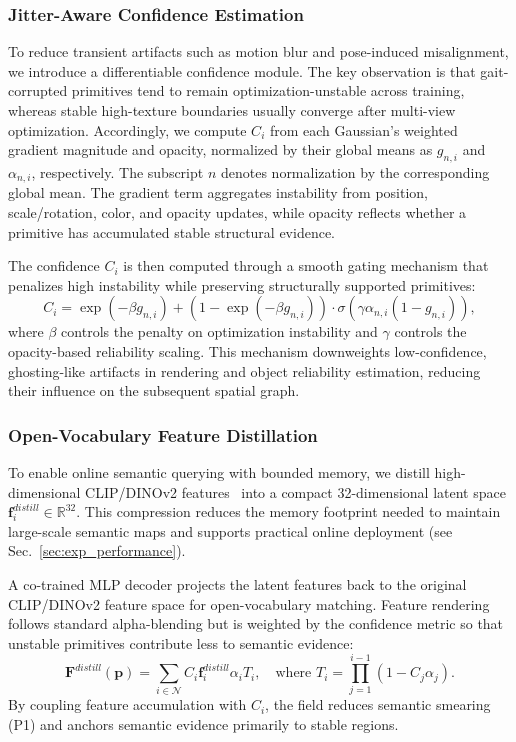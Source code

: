 \documentclass[conference]{IEEEtran}
\begin{document}
\subsubsection{Jitter-Aware Confidence Estimation}
%
To reduce transient artifacts such as motion blur and pose-induced misalignment, we introduce a differentiable confidence module.
%
The key observation is that gait-corrupted primitives tend to remain optimization-unstable across training, whereas stable high-texture boundaries usually converge after multi-view optimization.
%
Accordingly, we compute $C_i$ from each Gaussian's weighted gradient magnitude and opacity, normalized by their global means as $g_{n,i}$ and $\alpha_{n,i}$, respectively.
%
The subscript $n$ denotes normalization by the corresponding global mean.
%
The gradient term aggregates instability from position, scale/rotation, color, and opacity updates, while opacity reflects whether a primitive has accumulated stable structural evidence.


The confidence $C_i$ is then computed through a smooth gating mechanism that penalizes high instability while preserving structurally supported primitives:
\begin{equation}
    C_i = \exp(-\beta g_{n,i}) + (1 - \exp(-\beta g_{n,i})) \cdot \sigma(\gamma \alpha_{n,i}(1 - g_{n,i})) \label{eq:confidence},
\end{equation}
%
where $\beta$ controls the penalty on optimization instability and $\gamma$ controls the opacity-based reliability scaling.
%
This mechanism downweights low-confidence, ghosting-like artifacts in rendering and object reliability estimation, reducing their influence on the subsequent spatial graph.
%

\subsubsection{Open-Vocabulary Feature Distillation}
%
To enable online semantic querying with bounded memory, we distill high-dimensional CLIP/DINOv2 features~\cite{radford2021learning, oquab2024dinov2} into a compact 32-dimensional latent space $\mathbf{f}_i^{distill} \in \mathbb{R}^{32}$.
%
This compression reduces the memory footprint needed to maintain large-scale semantic maps and supports practical online deployment (see Sec.~\ref{sec:exp_performance}).

%
A co-trained MLP decoder projects the latent features back to the original CLIP/DINOv2 feature space for open-vocabulary matching.
%
Feature rendering follows standard alpha-blending but is weighted by the confidence metric so that unstable primitives contribute less to semantic evidence:
\begin{equation}
    \mathbf{F}^{distill}(\mathbf{p}) = \sum_{i \in \mathcal{N}} C_i \mathbf{f}_i^{distill} \alpha_i T_i, \quad \text{where } T_i = \prod_{j=1}^{i-1} (1 - C_j \alpha_j). \label{eq:rendering}
\end{equation}
By coupling feature accumulation with $C_i$, the field reduces semantic smearing (P1) and anchors semantic evidence primarily to stable regions.
\end{document}
